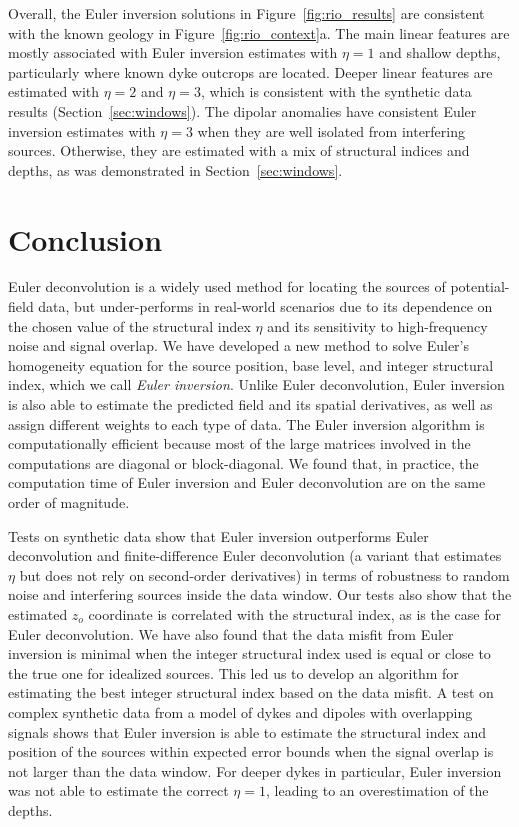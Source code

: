 Overall, the Euler inversion solutions in Figure~\ref{fig:rio_results} are consistent with the known geology in Figure~\ref{fig:rio_context}a.
The main linear features are mostly associated with Euler inversion estimates with $\eta=1$ and shallow depths, particularly where known dyke outcrops are located.
Deeper linear features are estimated with $\eta=2$ and $\eta=3$, which is consistent with the synthetic data results (Section~\ref{sec:windows}).
The dipolar anomalies have consistent Euler inversion estimates with $\eta=3$ when they are well isolated from interfering sources.
Otherwise, they are estimated with a mix of structural indices and depths, as was demonstrated in Section~\ref{sec:windows}.

\section{Conclusion}

Euler deconvolution is a widely used method for locating the sources of potential-field data, but under-performs in real-world scenarios due to its dependence on the chosen value of the structural index $\eta$ and its sensitivity to high-frequency noise and signal overlap.
We have developed a new method to solve Euler's homogeneity equation for the source position, base level, and integer structural index, which we call \textit{Euler inversion}.
Unlike Euler deconvolution, Euler inversion is also able to estimate the predicted field and its spatial derivatives, as well as assign different weights to each type of data.
The Euler inversion algorithm is computationally efficient because most of the large matrices involved in the computations are diagonal or block-diagonal.
We found that, in practice, the computation time of Euler inversion and Euler deconvolution are on the same order of magnitude.

Tests on synthetic data show that Euler inversion outperforms Euler deconvolution and finite-dif\-fer\-ence Euler deconvolution (a variant that estimates $\eta$ but does not rely on second-order derivatives) in terms of robustness to random noise and interfering sources inside the data window.
Our tests also show that the estimated $z_o$ coordinate is correlated with the structural index, as is the case for Euler deconvolution.
We have also found that the data misfit from Euler inversion is minimal when the integer structural index used is equal or close to the true one for idealized sources.
This led us to develop an algorithm for estimating the best integer structural index based on the data misfit.
A test on complex synthetic data from a model of dykes and dipoles with overlapping signals shows that Euler inversion is able to estimate the structural index and position of the sources within expected error bounds when the signal overlap is not larger than the data window.
For deeper dykes in particular, Euler inversion was not able to estimate the correct $\eta=1$, leading to an overestimation of the depths.

